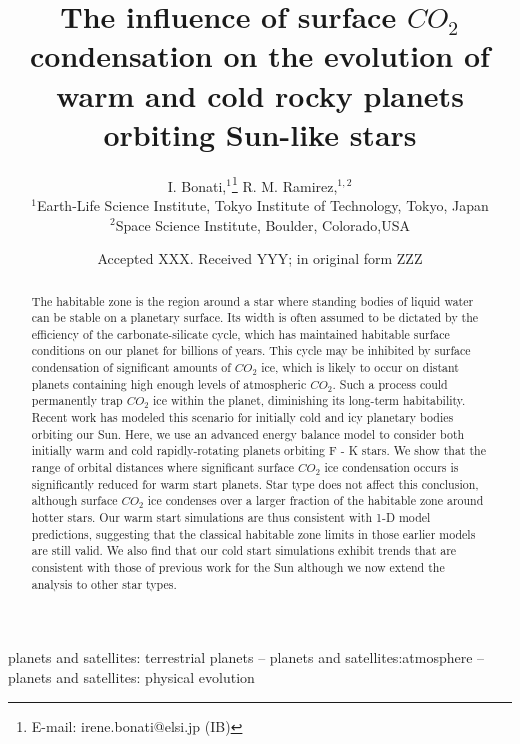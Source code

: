 \documentclass[fleqn,usenatbib]{mnras}
\title[$CO_{\mathrm{2}}$ condensation on rocky planets]{The influence of surface $CO_{\mathrm{2}}$ condensation on the evolution of warm and cold rocky planets orbiting Sun-like stars}
\author[I. Bonati and R. Ramirez]{
I. Bonati,$^{1}$\thanks{E-mail: irene.bonati@elsi.jp (IB)}
R. M. Ramirez,$^{1,2}$
\\
$^{1}$Earth-Life Science Institute, Tokyo Institute of Technology, Tokyo, Japan\\
$^{2}$Space Science Institute, Boulder, Colorado,USA\\
}
\date{Accepted XXX. Received YYY; in original form ZZZ}
\begin{document}
\newcommand{\add}[1]{\textcolor{greenblue}{#1}}
\newcommand{\irene}[1]{\textcolor{greenblue}{\textit{(Irene: #1)}}}
\newcommand{\ramses}[1]{\textcolor{greenish}{\textit{(Ramses: #1)}}}
\newcommand{\todo}[1]{\textcolor{red}{#1}}
\newcommand{\textb}[1]{\textcolor{greenblue}{#1}}
\newcommand{\textg}[1]{\textcolor{greenish}{#1}}
\label{firstpage}
\pagerange{\pageref{firstpage}--\pageref{lastpage}}
\maketitle

\begin{abstract}
The habitable zone is the region around a star where standing bodies of liquid water can be stable on a planetary surface. Its width is often assumed to be dictated by the efficiency of the carbonate-silicate cycle, which has maintained habitable surface conditions on our planet for billions of years. This cycle may be inhibited by surface condensation of significant amounts of $CO_{\mathrm{2}}$ ice, which is likely to occur on distant planets containing high enough levels of atmospheric $CO_{\mathrm{2}}$. Such a process could permanently trap $CO_{\mathrm{2}}$ ice within the planet, diminishing its long-term habitability. Recent work has modeled this scenario for initially cold and icy planetary bodies orbiting our Sun. Here, we use an advanced energy balance model to consider both initially warm and cold rapidly-rotating planets orbiting F - K stars. We show that the range of orbital distances where significant surface $CO_{\mathrm{2}}$ ice condensation occurs is significantly reduced for warm start planets. Star type does not affect this conclusion, although surface $CO_{\mathrm{2}}$ ice condenses over a larger fraction of the habitable zone around hotter stars. Our warm start simulations are thus consistent with 1-D model predictions, suggesting that the classical habitable zone limits in those earlier models are still valid. We also find that our cold start simulations exhibit trends that are consistent with those of previous work for the Sun although we now extend the analysis to other star types.    
\end{abstract}

\begin{keywords}
planets and satellites: terrestrial planets -- planets and satellites:atmosphere -- planets and satellites: physical evolution
\end{keywords}
\end{document}
